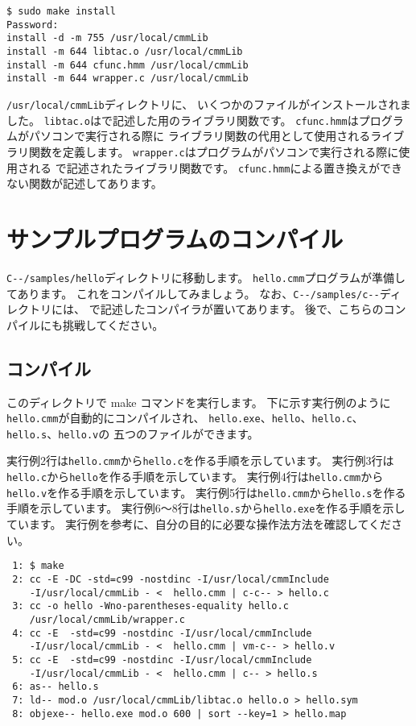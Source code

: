 \begin{mylist}
\begin{verbatim}
$ sudo make install
Password:
install -d -m 755 /usr/local/cmmLib
install -m 644 libtac.o /usr/local/cmmLib
install -m 644 cfunc.hmm /usr/local/cmmLib
install -m 644 wrapper.c /usr/local/cmmLib
\end{verbatim}
\end{mylist}

\verb;/usr/local/cmmLib;ディレクトリに、
いくつかのファイルがインストールされました。
\verb;libtac.o;は{\cmml}で記述した{\tacos}用のライブラリ関数です。
\verb;cfunc.hmm;は{\cmm}プログラムがパソコンで実行される際に
{\cmml}ライブラリ関数の代用として使用される{\cl}ライブラリ関数を定義します。
\verb;wrapper.c;は{\cmm}プログラムがパソコンで実行される際に使用される
{\cl}で記述された{\cmm}ライブラリ関数です。
\verb;cfunc.hmm;による置き換えができない関数が記述してあります。

\section{サンプルプログラムのコンパイル}

\verb;C--/samples/hello;ディレクトリに移動します。
{\tt hello.cmm}プログラムが準備してあります。
これをコンパイルしてみましょう。
なお、\verb;C--/samples/c--;ディレクトリには、
{\cmml}で記述した{\cmm}コンパイラが置いてあります。
後で、こちらのコンパイルにも挑戦してください。

\subsection{コンパイル}

このディレクトリで make コマンドを実行します。
下に示す実行例のように{\tt hello.cmm}が自動的にコンパイルされ、
{\tt hello.exe}、{\tt hello}、{\tt hello.c}、{\tt hello.s}、{\tt hello.v}の
五つのファイルができます。

実行例2行は{\tt hello.cmm}から{\tt hello.c}を作る手順を示しています。
実行例3行は{\tt hello.c}から{\tt hello}を作る手順を示しています。
実行例4行は{\tt hello.cmm}から{\tt hello.v}を作る手順を示しています。
実行例5行は{\tt hello.cmm}から{\tt hello.s}を作る手順を示しています。
実行例6〜8行は{\tt hello.s}から{\tt hello.exe}を作る手順を示しています。
実行例を参考に、自分の目的に必要な操作法方法を確認してください。

\begin{mylist}
\begin{verbatim}
 1: $ make
 2: cc -E -DC -std=c99 -nostdinc -I/usr/local/cmmInclude
    -I/usr/local/cmmLib - <  hello.cmm | c-c-- > hello.c
 3: cc -o hello -Wno-parentheses-equality hello.c
    /usr/local/cmmLib/wrapper.c
 4: cc -E  -std=c99 -nostdinc -I/usr/local/cmmInclude
    -I/usr/local/cmmLib - <  hello.cmm | vm-c-- > hello.v
 5: cc -E  -std=c99 -nostdinc -I/usr/local/cmmInclude
    -I/usr/local/cmmLib - <  hello.cmm | c-- > hello.s
 6: as-- hello.s
 7: ld-- mod.o /usr/local/cmmLib/libtac.o hello.o > hello.sym
 8: objexe-- hello.exe mod.o 600 | sort --key=1 > hello.map
\end{verbatim}
\end{mylist}

